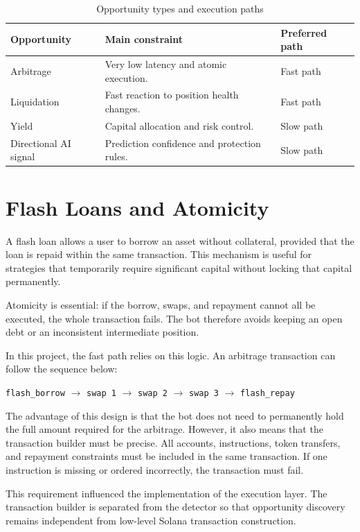 \documentclass[12pt,a4paper]{report}
\begin{document}
\begin{table}[H]
\centering
\begin{tabularx}{\textwidth}{lX X}
\toprule
\textbf{Opportunity} & \textbf{Main constraint} & \textbf{Preferred path} \\
\midrule
Arbitrage & Very low latency and atomic execution. & Fast path \\
Liquidation & Fast reaction to position health changes. & Fast path \\
Yield & Capital allocation and risk control. & Slow path \\
Directional AI signal & Prediction confidence and protection rules. & Slow path \\
\bottomrule
\end{tabularx}
\caption{Opportunity types and execution paths}
\label{tab:opp_paths}
\end{table}

\section{Flash Loans and Atomicity}

A flash loan allows a user to borrow an asset without collateral, provided that the loan is repaid within the same transaction. This mechanism is useful for strategies that temporarily require significant capital without locking that capital permanently.

Atomicity is essential: if the borrow, swaps, and repayment cannot all be executed, the whole transaction fails. The bot therefore avoids keeping an open debt or an inconsistent intermediate position.

In this project, the fast path relies on this logic. An arbitrage transaction can follow the sequence below:

\begin{center}
\texttt{flash\_borrow} $\rightarrow$ \texttt{swap 1} $\rightarrow$ \texttt{swap 2} $\rightarrow$ \texttt{swap 3} $\rightarrow$ \texttt{flash\_repay}
\end{center}

The advantage of this design is that the bot does not need to permanently hold the full amount required for the arbitrage. However, it also means that the transaction builder must be precise. All accounts, instructions, token transfers, and repayment constraints must be included in the same transaction. If one instruction is missing or ordered incorrectly, the transaction must fail.

This requirement influenced the implementation of the execution layer. The transaction builder is separated from the detector so that opportunity discovery remains independent from low-level Solana transaction construction.
\end{document}
